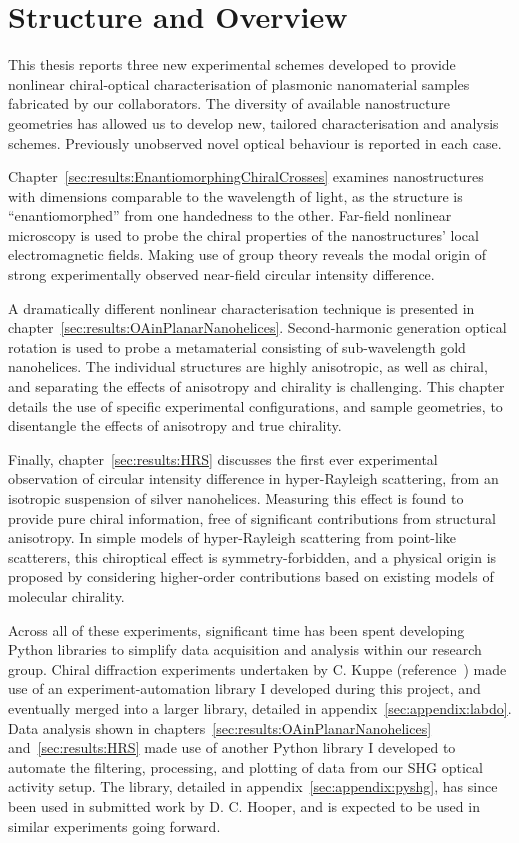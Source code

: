 \chapter{Structure and Overview}\label{sec:background:Introduction}

This thesis reports three new experimental schemes developed to provide nonlinear chiral-optical characterisation of plasmonic nanomaterial samples fabricated by our collaborators. 
The diversity of available nanostructure geometries has allowed us to develop new, tailored characterisation and analysis schemes. Previously unobserved novel optical behaviour is reported in each case.

Chapter~\ref{sec:results:EnantiomorphingChiralCrosses} examines nanostructures with dimensions comparable to the wavelength of light, as the structure is ``enantiomorphed'' from one handedness to the other. Far-field nonlinear microscopy is used to probe the chiral properties of the nanostructures' local electromagnetic fields. Making use of group theory reveals the modal origin of strong experimentally observed near-field circular intensity difference. 

A dramatically different nonlinear characterisation technique is presented in chapter~\ref{sec:results:OAinPlanarNanohelices}. Second-harmonic generation optical rotation is used to probe a metamaterial consisting of sub-wavelength gold nanohelices. The individual structures are highly anisotropic, as well as chiral, and separating the effects of anisotropy and chirality is challenging. This chapter details the use of specific experimental configurations, and sample geometries, to disentangle the effects of anisotropy and true chirality. 

Finally, chapter~\ref{sec:results:HRS} discusses the first ever experimental observation of circular intensity difference in hyper-Rayleigh scattering, from an isotropic suspension of silver nanohelices. Measuring this effect is found to provide pure chiral information, free of significant contributions from structural anisotropy. In simple models of hyper-Rayleigh scattering from point-like scatterers, this chiroptical effect is symmetry-forbidden, and a physical origin is proposed by considering higher-order contributions based on existing models of molecular chirality.

Across all of these experiments, significant time has been spent developing Python libraries to simplify data acquisition and analysis within our research group. Chiral diffraction experiments undertaken by C. Kuppe (reference~\cite{Kuppe2018}) made use of an experiment-automation library I developed during this project, and eventually merged into a larger library, detailed in appendix~\ref{sec:appendix:labdo}. Data analysis shown in chapters~\ref{sec:results:OAinPlanarNanohelices} and~\ref{sec:results:HRS} made use of another Python library I developed to automate the filtering, processing, and plotting of data from our SHG optical activity setup. The library, detailed in appendix~\ref{sec:appendix:pyshg}, has since been used in submitted work by D. C. Hooper, and is expected to be used in similar experiments going forward.

